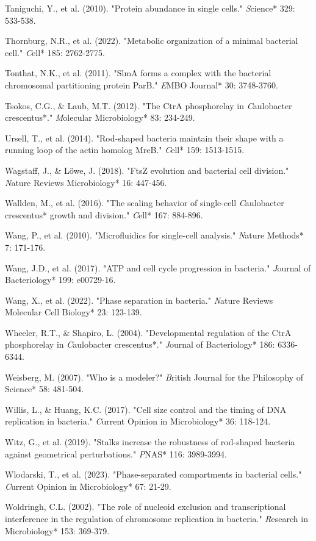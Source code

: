 \documentclass[11pt,a4paper]{article}
\begin{document}
Taniguchi, Y., et al. (2010). "Protein abundance in single cells." \textit*Science* 329: 533-538.

Thornburg, N.R., et al. (2022). "Metabolic organization of a minimal bacterial cell." \textit*Cell* 185: 2762-2775.

Tonthat, N.K., et al. (2011). "SlmA forms a complex with the bacterial chromosomal partitioning protein ParB." \textit*EMBO Journal* 30: 3748-3760.

Tsokos, C.G., & Laub, M.T. (2012). "The CtrA phosphorelay in \textit*Caulobacter crescentus*." \textit*Molecular Microbiology* 83: 234-249.

Ursell, T., et al. (2014). "Rod-shaped bacteria maintain their shape with a running loop of the actin homolog MreB." \textit*Cell* 159: 1513-1515.

Wagstaff, J., & Löwe, J. (2018). "FtsZ evolution and bacterial cell division." \textit*Nature Reviews Microbiology* 16: 447-456.

Wallden, M., et al. (2016). "The scaling behavior of single-cell \textit*Caulobacter crescentus* growth and division." \textit*Cell* 167: 884-896.

Wang, P., et al. (2010). "Microfluidics for single-cell analysis." \textit*Nature Methods* 7: 171-176.

Wang, J.D., et al. (2017). "ATP and cell cycle progression in bacteria." \textit*Journal of Bacteriology* 199: e00729-16.

Wang, X., et al. (2022). "Phase separation in bacteria." \textit*Nature Reviews Molecular Cell Biology* 23: 123-139.

Wheeler, R.T., & Shapiro, L. (2004). "Developmental regulation of the CtrA phosphorelay in \textit*Caulobacter crescentus*." \textit*Journal of Bacteriology* 186: 6336-6344.

Weisberg, M. (2007). "Who is a modeler?" \textit*British Journal for the Philosophy of Science* 58: 481-504.

Willis, L., & Huang, K.C. (2017). "Cell size control and the timing of DNA replication in bacteria." \textit*Current Opinion in Microbiology* 36: 118-124.

Witz, G., et al. (2019). "Stalks increase the robustness of rod-shaped bacteria against geometrical perturbations." \textit*PNAS* 116: 3989-3994.

Wlodarski, T., et al. (2023). "Phase-separated compartments in bacterial cells." \textit*Current Opinion in Microbiology* 67: 21-29.

Woldringh, C.L. (2002). "The role of nucleoid exclusion and transcriptional interference in the regulation of chromosome replication in bacteria." \textit*Research in Microbiology* 153: 369-379.
\end{document}

